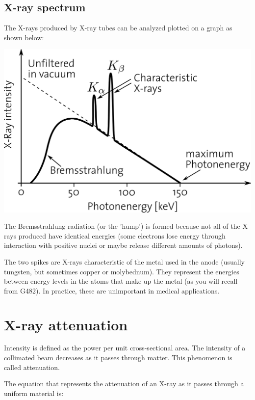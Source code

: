 \documentclass{article}
\begin{document}
\subsection{X-ray spectrum}

The X-rays produced by X-ray tubes can be analyzed plotted on a graph as shown
below:

\begin{center}
	\includegraphics[scale=0.8]{Characteristic_Spectrum}
\end{center}

The Bremsstrahlung radiation (or the 'hump') is formed because not all of the
X-rays produced have identical energies (some electrons lose energy through
interaction with positive nuclei or maybe release different amounts of photons).

The two spikes are X-rays characteristic of the metal used in the anode (usually
tungsten, but sometimes copper or molybednum). They represent the energies
between energy levels in the atoms that make up the metal (as you will recall
from G482). In practice, these are unimportant in medical applications.

\section{X-ray attenuation}

Intensity is defined as the power per unit cross-sectional area. The intensity
of a collimated  beam decreases as it passes through matter. This phenomenon is called
attenuation.

The equation that represents the attenuation of an X-ray as it passes through a
uniform material is:
\end{document}
